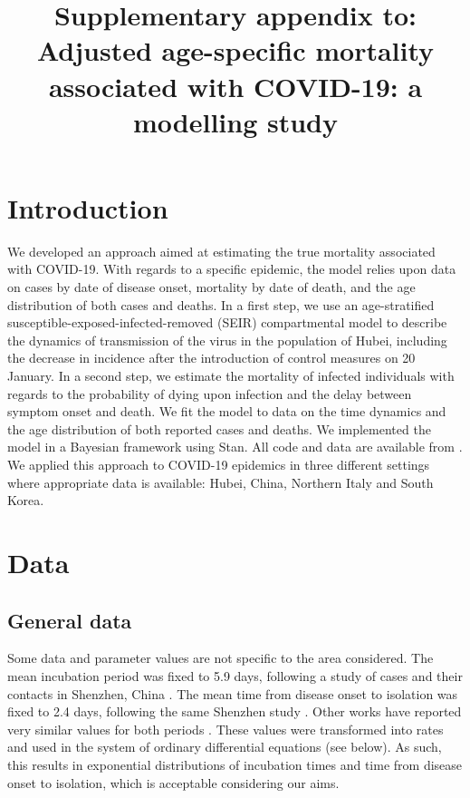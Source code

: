 \documentclass{article}
\title{Supplementary appendix to: \\ {\Large Adjusted age-specific mortality associated with COVID-19: a modelling study}}
\begin{document}
	
	\maketitle
	
	\section{Introduction}
	
	We developed an approach aimed at estimating the true mortality associated with COVID-19.
	With regards to a specific epidemic, the model relies upon data on cases by date of disease onset, mortality by date of death, and the age distribution of both cases and deaths.
	In a first step, we use an age-stratified susceptible-exposed-infected-removed (SEIR) compartmental model to describe the dynamics of transmission of the virus in the population of Hubei, including the decrease in incidence after the introduction of control measures on 20 January.
	In a second step, we estimate the mortality of infected individuals with regards to the probability of dying upon infection and the delay between symptom onset and death. 
	We fit the model to data on the time dynamics and the age distribution of both reported cases and deaths.
	We implemented the model in a Bayesian framework using Stan. 
	All code and data are available from \underline{}.
	We applied this approach to COVID-19 epidemics in three different settings where appropriate data is available: Hubei, China, Northern Italy and South Korea.
	
	\section{Data}
	
	\subsection{General data}
	
	Some data and parameter values are not specific to the area considered.
	The mean incubation period was fixed to 5.9 days, following a study of cases and their contacts in Shenzhen, China \cite{Bi2020}.
	The mean time from disease onset to isolation was fixed to 2.4 days, following the same Shenzhen study \cite{Bi2020}.
	Other works have reported very similar values for both periods \cite{lauerincubation,linton2020incubation,backer2020incubation}.
	These values were transformed into rates and used in the system of ordinary differential equations (see below).
	As such, this results in exponential distributions of incubation times and time from disease onset to isolation, which is acceptable considering our aims.
	
\end{document}
